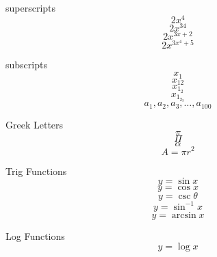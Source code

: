 \documentclass[12pt]{article}
\begin{document}
superscripts
$$2x^4$$ 
$$2x^{34}$$
$$2x^{3x+2}$$
$$2x^{3x^4+5}$$



subscripts
$$x_1$$
$$x_{12}$$
$$x_{1_2}$$
$$x_{1_{2_3}}$$
$$a_1, a_2, a_3, \ldots, a_{100}$$


Greek Letters
$$\pi$$
$$\Pi$$
$$\alpha$$
$$A = \pi r^2$$

Trig Functions
\[ y = \sin x \]
\[ y = \cos x \]
\[ y = \csc \theta \]
\[ y = \sin^{-1} x \]
\[ y = \arcsin x \]

Log Functions
\[ y = \log x \]
\end{document}
